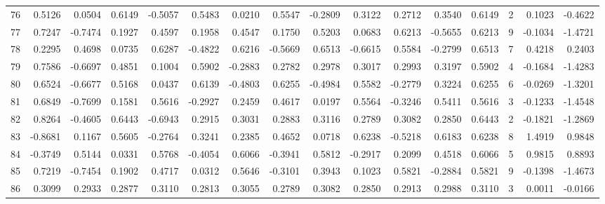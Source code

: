 \begin{tabular}{lrrrrrrrrrrrrrrr}
76  &      0.5126 &  0.0504 &  0.6149 & -0.5057 &  0.5483 &  0.0210 &  0.5547 & -0.2809 &  0.3122 &  0.2712 &   0.3540 &     0.6149 &      2 &                    0.1023 &                    -0.4622 \\
77  &      0.7247 & -0.7474 &  0.1927 &  0.4597 &  0.1958 &  0.4547 &  0.1750 &  0.5203 &  0.0683 &  0.6213 &  -0.5655 &     0.6213 &      9 &                   -0.1034 &                    -1.4721 \\
78  &      0.2295 &  0.4698 &  0.0735 &  0.6287 & -0.4822 &  0.6216 & -0.5669 &  0.6513 & -0.6615 &  0.5584 &  -0.2799 &     0.6513 &      7 &                    0.4218 &                     0.2403 \\
79  &      0.7586 & -0.6697 &  0.4851 &  0.1004 &  0.5902 & -0.2883 &  0.2782 &  0.2978 &  0.3017 &  0.2993 &   0.3197 &     0.5902 &      4 &                   -0.1684 &                    -1.4283 \\
80  &      0.6524 & -0.6677 &  0.5168 &  0.0437 &  0.6139 & -0.4803 &  0.6255 & -0.4984 &  0.5582 & -0.2779 &   0.3224 &     0.6255 &      6 &                   -0.0269 &                    -1.3201 \\
81  &      0.6849 & -0.7699 &  0.1581 &  0.5616 & -0.2927 &  0.2459 &  0.4617 &  0.0197 &  0.5564 & -0.3246 &   0.5411 &     0.5616 &      3 &                   -0.1233 &                    -1.4548 \\
82  &      0.8264 & -0.4605 &  0.6443 & -0.6943 &  0.2915 &  0.3031 &  0.2883 &  0.3116 &  0.2789 &  0.3082 &   0.2850 &     0.6443 &      2 &                   -0.1821 &                    -1.2869 \\
83  &     -0.8681 &  0.1167 &  0.5605 & -0.2764 &  0.3241 &  0.2385 &  0.4652 &  0.0718 &  0.6238 & -0.5218 &   0.6183 &     0.6238 &      8 &                    1.4919 &                     0.9848 \\
84  &     -0.3749 &  0.5144 &  0.0331 &  0.5768 & -0.4054 &  0.6066 & -0.3941 &  0.5812 & -0.2917 &  0.2099 &   0.4518 &     0.6066 &      5 &                    0.9815 &                     0.8893 \\
85  &      0.7219 & -0.7454 &  0.1902 &  0.4717 &  0.0312 &  0.5646 & -0.3101 &  0.3943 &  0.1023 &  0.5821 &  -0.2884 &     0.5821 &      9 &                   -0.1398 &                    -1.4673 \\
86  &      0.3099 &  0.2933 &  0.2877 &  0.3110 &  0.2813 &  0.3055 &  0.2789 &  0.3082 &  0.2850 &  0.2913 &   0.2988 &     0.3110 &      3 &                    0.0011 &                    -0.0166 \\

\end{tabular}

